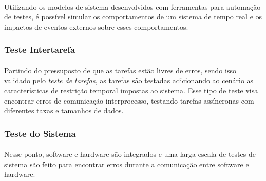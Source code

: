 \paragraph{}
Utilizando os modelos de sistema desenvolvidos com ferramentas para automação de testes, é possível simular os comportamentos
de um sistema de tempo real e os impactos de eventos externos sobre esses comportamentos.

\subsubsection{Teste Intertarefa}
\paragraph{}
Partindo do pressuposto de que as tarefas estão livres de erros, sendo isso validado pelo \textit{teste de tarefas}, as tarefas são
testadas adicionando ao cenário as características de restrição temporal impostas ao sistema. Esse tipo de teste visa encontrar
erros de comunicação interprocesso, testando tarefas assíncronas com diferentes taxas e tamanhos de dados.

\subsubsection{Teste do Sistema}
\paragraph{}
Nesse ponto, software e hardware são integrados e uma larga escala de testes de sistema são feito para encontrar erros durante
a comunicação entre software e hardware.
